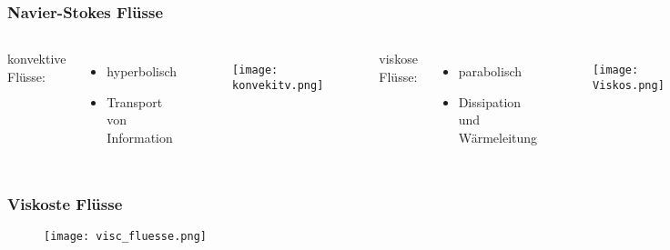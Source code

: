 \documentclass[
	11pt, %
	aspectratio=169, %
]{beamer}
\begin{document}
\begin{frame}
	\frametitle{Navier-Stokes Flüsse}
	\begin{columns}
	konvektive Flüsse:
	\begin{itemize}
		\item hyperbolisch
		\item Transport von Information
	\end{itemize}

	\begin{figure}
			\texttt{[image: konvekitv.png]}
	\end{figure}
	viskose Flüsse:
	\begin{itemize}
		\item parabolisch
		\item Dissipation und Wärmeleitung
	\end{itemize}

	\begin{figure}
			\texttt{[image: Viskos.png]}
		\end{figure}
	\end{columns}
\end{frame}

\begin{frame}
	\frametitle{Viskoste Flüsse}
	\begin{center}
		\begin{figure}
			\texttt{[image: visc\_fluesse.png]}
		\end{figure}
	\end{center}
\end{frame}
\end{document}
